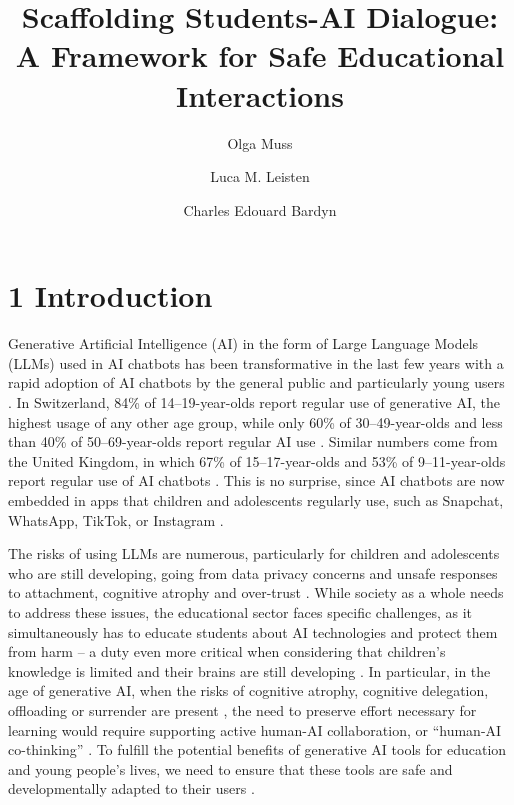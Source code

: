 \documentclass[fleqn,10pt]{wlscirep}
\title{Scaffolding Students-AI Dialogue: A Framework for Safe Educational Interactions}
\author[1,2,+,*]{Olga Muss}
\author[2,+]{Luca M. Leisten}
\author[3]{Charles Edouard Bardyn}
\affil[1]{Université de Neuchâtel, ETH Zurich}
\affil[2]{ETH Zurich}
\affil[3]{AI Swiss}
\affil[*]{olga.muss@unine.ch}
\affil[+]{these authors contributed equally to this work}
\begin{document}
\flushbottom
\maketitle
\thispagestyle{empty}

\section*{1 Introduction}

Generative Artificial Intelligence (AI) in the form of Large Language Models (LLMs) used in AI chatbots has been transformative in the last few years with a rapid adoption of AI chatbots by the general public and particularly young users \cite{InternetMatters2025, CommonSense2025, Hashem2025, Microsoft2024}. In Switzerland, 84\% of 14--19-year-olds report regular use of generative AI, the highest usage of any other age group, while only 60\% of 30--49-year-olds and less than 40\% of 50--69-year-olds report regular AI use \cite{WIP-CH2025}. Similar numbers come from the United Kingdom, in which 67\% of 15--17-year-olds and 53\% of 9--11-year-olds report regular use of AI chatbots \cite{InternetMatters2025}. This is no surprise, since AI chatbots are now embedded in apps that children and adolescents regularly use, such as Snapchat, WhatsApp, TikTok, or Instagram \cite{Ofcom2025, Vosloo2025}.

The risks of using LLMs are numerous, particularly for children and adolescents who are still developing, going from data privacy concerns and unsafe responses to attachment, cognitive atrophy and over-trust \cite{Neugnot2024, Kurian2025, UNESCO2021, VIOLA2017, Yu2025}. While society as a whole needs to address these issues, the educational sector faces specific challenges, as it simultaneously has to educate students about AI technologies and protect them from harm \cite{UNCRC1989} -- a duty even more critical when considering that children's knowledge is limited and their brains are still developing \cite{Gogtay2004}. In particular, in the age of generative AI, when the risks of cognitive atrophy, cognitive delegation, offloading or surrender are present \cite{Shaw2026}, the need to preserve effort necessary for learning would require supporting active human-AI collaboration, or ``human-AI co-thinking'' \cite{BardynForthcoming}. To fulfill the potential benefits of generative AI tools for education and young people's lives, we need to ensure that these tools are safe and developmentally adapted to their users \cite{UNESCO2021}.
\end{document}
